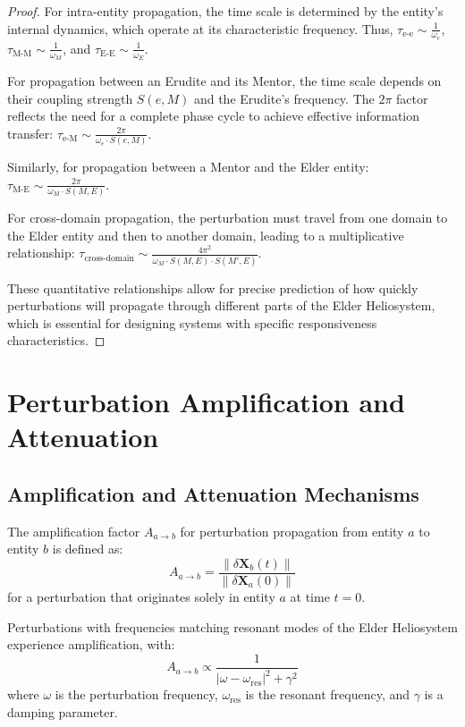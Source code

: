 \begin{proof}
For intra-entity propagation, the time scale is determined by the entity's internal dynamics, which operate at its characteristic frequency. Thus, $\tau_{\text{e-e}} \sim \frac{1}{\omega_e}$, $\tau_{\text{M-M}} \sim \frac{1}{\omega_M}$, and $\tau_{\text{E-E}} \sim \frac{1}{\omega_E}$.

For propagation between an Erudite and its Mentor, the time scale depends on their coupling strength $S(e,M)$ and the Erudite's frequency. The $2\pi$ factor reflects the need for a complete phase cycle to achieve effective information transfer: $\tau_{\text{e-M}} \sim \frac{2\pi}{\omega_e \cdot S(e,M)}$.

Similarly, for propagation between a Mentor and the Elder entity: $\tau_{\text{M-E}} \sim \frac{2\pi}{\omega_M \cdot S(M,E)}$.

For cross-domain propagation, the perturbation must travel from one domain to the Elder entity and then to another domain, leading to a multiplicative relationship: $\tau_{\text{cross-domain}} \sim \frac{4\pi^2}{\omega_M \cdot S(M,E) \cdot S(M',E)}$.

These quantitative relationships allow for precise prediction of how quickly perturbations will propagate through different parts of the Elder Heliosystem, which is essential for designing systems with specific responsiveness characteristics.
\end{proof}

\section{Perturbation Amplification and Attenuation}

\subsection{Amplification and Attenuation Mechanisms}

\begin{definition}
The amplification factor $A_{a \to b}$ for perturbation propagation from entity $a$ to entity $b$ is defined as:
\begin{equation}
A_{a \to b} = \frac{\|\delta\mathbf{X}_b(t)\|}{\|\delta\mathbf{X}_a(0)\|}
\end{equation}
for a perturbation that originates solely in entity $a$ at time $t=0$.
\end{definition}

\begin{theorem}
Perturbations with frequencies matching resonant modes of the Elder Heliosystem experience amplification, with:
\begin{equation}
A_{a \to b} \propto \frac{1}{|\omega - \omega_{\text{res}}|^2 + \gamma^2}
\end{equation}
where $\omega$ is the perturbation frequency, $\omega_{\text{res}}$ is the resonant frequency, and $\gamma$ is a damping parameter.
\end{theorem}

